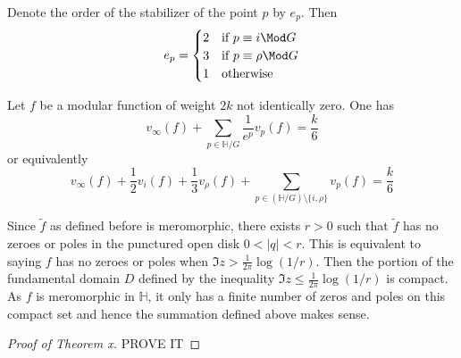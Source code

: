 \documentclass[12pt]{article}
\theoremstyle{definition}
\begin{document}
Denote the order of the stabilizer of the point \(p\) by \(e_p\). Then 
\[
    e_p = \begin{cases}
        2 & \text{if } p \equiv i \Mod G\\
        3 & \text{if } p \equiv \rho  \Mod G\\
        1 & \text{otherwise}
    \end{cases}
\] 
\begin{thm}[label=val]
Let \(f\) be a modular function of weight \(2k\) not identically zero. One has
\[
    v_\infty (f) + \sum_{p\in \mathbb{H}/G} \frac{1}{e^p}v_p(f) = \frac{k}{6} 
\]
or equivalently
\[
    v_\infty (f) + \frac{1}{2}v_i(f) + \frac{1}{3}v_{\rho }(f) + \sum_{p \in (\mathbb{H}/G)\setminus \{i,\rho   \} } v_p(f)=\frac{k}{6}  
\]
\end{thm}
Since \(\widetilde{f} \) as defined before is meromorphic, there exists \(r>0\) such that \(\widetilde{f} \) has no zeroes or poles in the punctured open disk \(0<\vert q \vert <r\). This is equivalent to saying \(f\) has no zeroes or poles when \(\Im z > \frac{1}{2\pi }\log (1/r)\). Then the portion of the fundamental domain \(D\) defined by the inequality \(\Im z \leq \frac{1}{2\pi }\log (1/r)\) is compact. As \(f\) is meromorphic in \(\mathbb{H}\), it only has a finite number of zeros and poles on this compact set and hence the summation defined above makes sense.
\begin{proof}[Proof of Theorem x]
PROVE IT
\end{proof} 
\end{document}
